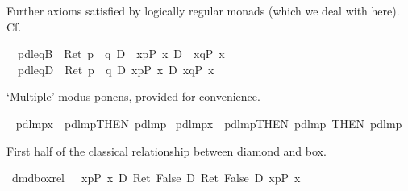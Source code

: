 \begin{isabellebody}
\isamarkupfalse%
\isamarkupfalse%
%
\begin{isamarkuptext}%
Further axioms satisfied by logically regular monads (which we deal with here).
  Cf. \cite[Page 601]{SchroederMossakowski:PDL}%
\end{isamarkuptext}%
\isamarkuptrue%
\isanewline
\ \ pdl{\isacharunderscore}eqB{\isacharcolon}\ {\isachardoublequote}{\isasymturnstile}\ Ret\ {\isacharparenleft}p\ {\isacharequal}\ q{\isacharparenright}\ {\isasymlongrightarrow}\isactrlsub D\ {\isacharbrackleft}{\isacharhash}\ x{\isasymleftarrow}p{\isacharbrackright}{\isacharparenleft}P\ x{\isacharparenright}\ {\isasymlongrightarrow}\isactrlsub D\ {\isacharbrackleft}{\isacharhash}\ x{\isasymleftarrow}q{\isacharbrackright}{\isacharparenleft}P\ x{\isacharparenright}{\isachardoublequote}\isanewline
\ \ pdl{\isacharunderscore}eqD{\isacharcolon}\ {\isachardoublequote}{\isasymturnstile}\ Ret\ {\isacharparenleft}p\ {\isacharequal}\ q{\isacharparenright}\ {\isasymlongrightarrow}\isactrlsub D\ {\isasymlangle}x{\isasymleftarrow}p{\isasymrangle}{\isacharparenleft}P\ x{\isacharparenright}\ {\isasymlongrightarrow}\isactrlsub D\ {\isasymlangle}x{\isasymleftarrow}q{\isasymrangle}{\isacharparenleft}P\ x{\isacharparenright}{\isachardoublequote}\isamarkupfalse%
%
\isamarkuptrue%
%
\begin{isamarkuptext}%
`Multiple' modus ponens, provided for convenience.%
\end{isamarkuptext}%
\isamarkuptrue%
\ \isanewline
pdl{\isacharunderscore}mp{\isacharunderscore}{}x\ {\isacharequal}\ pdl{\isacharunderscore}mp{\isacharbrackleft}THEN\ pdl{\isacharunderscore}mp{\isacharbrackright}\ \isanewline
pdl{\isacharunderscore}mp{\isacharunderscore}{}x\ {\isacharequal}\ pdl{\isacharunderscore}mp{\isacharbrackleft}THEN\ pdl{\isacharunderscore}mp{\isacharcomma}\ THEN\ pdl{\isacharunderscore}mp{\isacharbrackright}\isamarkupfalse%
%
\begin{isamarkuptext}%
First half of the classical relationship between diamond and box.%
\end{isamarkuptext}%
\isamarkuptrue%
\ dmd{\isacharunderscore}box{\isacharunderscore}rel{}{\isacharcolon}\ {\isachardoublequote}{\isasymturnstile}\ {\isacharparenleft}{\isacharbrackleft}{\isacharhash}\ x{\isasymleftarrow}p{\isacharbrackright}{\isacharparenleft}P\ x\ {\isasymlongrightarrow}\isactrlsub D\ Ret\ False{\isacharparenright}\ {\isasymlongrightarrow}\isactrlsub D\ Ret\ False{\isacharparenright}\ {\isasymlongrightarrow}\isactrlsub D\ {\isasymlangle}x{\isasymleftarrow}p{\isasymrangle}{\isacharparenleft}P\ x{\isacharparenright}{\isachardoublequote}\ \isanewline

\end{isabellebody}
